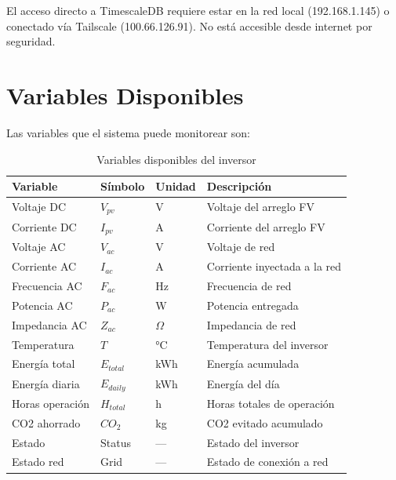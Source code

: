 \documentclass[12pt,a4paper]{article}
\begin{document}
\begin{warnbox}
El acceso directo a TimescaleDB requiere estar en la red local (192.168.1.145) o conectado v\'ia Tailscale (100.66.126.91). No est\'a accesible desde internet por seguridad.
\end{warnbox}

\section{Variables Disponibles}

Las variables que el sistema puede monitorear son:

\begin{table}[H]
\centering
\begin{tabular}{llll}
\toprule
\textbf{Variable} & \textbf{S\'imbolo} & \textbf{Unidad} & \textbf{Descripci\'on} \\
\midrule
Voltaje DC & $V_{pv}$ & V & Voltaje del arreglo FV \\
Corriente DC & $I_{pv}$ & A & Corriente del arreglo FV \\
Voltaje AC & $V_{ac}$ & V & Voltaje de red \\
Corriente AC & $I_{ac}$ & A & Corriente inyectada a la red \\
Frecuencia AC & $F_{ac}$ & Hz & Frecuencia de red \\
Potencia AC & $P_{ac}$ & W & Potencia entregada \\
Impedancia AC & $Z_{ac}$ & $\Omega$ & Impedancia de red \\
Temperatura & $T$ & °C & Temperatura del inversor \\
Energ\'ia total & $E_{total}$ & kWh & Energ\'ia acumulada \\
Energ\'ia diaria & $E_{daily}$ & kWh & Energ\'ia del d\'ia \\
Horas operaci\'on & $H_{total}$ & h & Horas totales de operaci\'on \\
CO2 ahorrado & $CO_2$ & kg & CO2 evitado acumulado \\
Estado & Status & --- & Estado del inversor \\
Estado red & Grid & --- & Estado de conexi\'on a red \\
\bottomrule
\end{tabular}
\caption{Variables disponibles del inversor}
\end{table}

\end{document}

